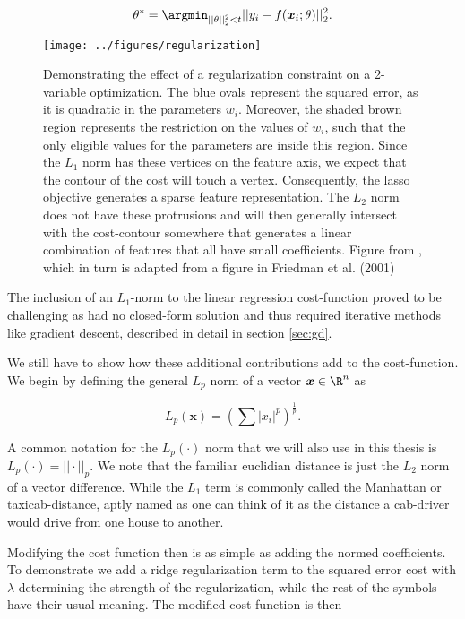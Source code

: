 \begin{align}
\theta^* = \argmin_{||\theta||_2^2<t} ||y_i - f(\boldsymbol{x}_i; \theta)||_2^2.
\end{align}

\begin{figure}
\centering
\texttt{[image: ../figures/regularization]}
\caption[Geometric interpretation of the $L_1$ and $L_2$ regularization and the squared error cost]{Demonstrating the effect of a regularization constraint on a 2-variable optimization. The blue ovals represent the squared error, as it is quadratic in the parameters $w_i$. Moreover, the shaded brown region represents the restriction on the values of $w_i$, such that the only eligible values for the parameters are inside this region. Since the $L_1$ norm has these vertices on the feature axis, we expect that the contour of the cost will touch a vertex. Consequently, the lasso objective generates a sparse feature representation. The $L_2$ norm does not have these protrusions and will then generally intersect with the cost-contour somewhere that generates a linear combination of features that all have small coefficients. Figure from \citet{Mehta2019}, which in turn is adapted from a figure in Friedman et al. (2001)}\label{fig:regularization}
\end{figure}

The inclusion of an $L_1$-norm to the linear regression cost-function proved to be challenging as had no closed-form solution and thus required iterative methods like gradient descent, described in detail in section \ref{sec:gd}. 

We still have to show how these additional contributions add to the cost-function. We begin by defining the general $L_p$ norm of a vector $\boldsymbol{x} \in \R^n$ as

\begin{equation}
L_p(\boldsymbol{x}) = \left(\sum |x_i|^p\right)^{\frac{1}{p}}.
\end{equation}

\noindent A common notation for the $L_p(\cdot)$ norm that we will also use in this thesis is $L_p(\cdot) = ||\cdot||_p$. We note that the familiar euclidian distance is just the $L_2$ norm of a vector difference. While the $L_1$ term is commonly called the Manhattan or taxicab-distance, aptly named as one can think of it as the distance a cab-driver would drive from one house to another.

Modifying the cost function then is as simple as adding the normed coefficients. To demonstrate we add a ridge regularization term to the squared error cost with $\lambda$ determining the strength of the regularization, while the rest of the symbols have their usual meaning. The modified cost function is then

